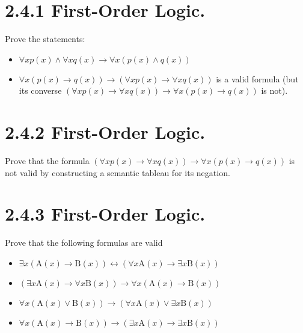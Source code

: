 \documentclass{article}
\begin{document}
\section*{2.4.1 First-Order Logic.}
Prove the statements:
\begin{itemize}
    \item $\forall x p ( x ) \wedge \forall x q ( x ) \rightarrow \forall x ( p ( x ) \wedge q ( x ) )$
    
    \item $\forall x ( p ( x ) \rightarrow q ( x ) ) \rightarrow ( \forall x p ( x ) \rightarrow \forall x q ( x ) )$ is a valid formula (but its converse $( \forall x p ( x ) \rightarrow \forall x q ( x ) ) \rightarrow \forall x ( p ( x ) \rightarrow q ( x ) )$ is not).
\end{itemize}

\section*{2.4.2 First-Order Logic.}
Prove that the formula $( \forall x p ( x ) \rightarrow \forall x q ( x ) ) \rightarrow \forall x ( p ( x ) \rightarrow q ( x ) )$ is not valid by constructing a semantic tableau for its negation.

\section*{2.4.3 First-Order Logic.}
Prove that the following formulas are valid
\begin{itemize}
    \item $\exists x (\mathrm { A } ( x ) \rightarrow \mathrm { B } ( x ) ) \leftrightarrow ( \forall x \mathrm { A } ( x ) \rightarrow \exists x \mathrm { B } ( x ) )$
    \item $(\exists x \mathrm { A } ( x ) \rightarrow \forall x \mathrm { B } ( x ) ) \rightarrow \forall x ( \mathrm { A } ( x ) \rightarrow \mathrm { B } ( x ) )$
    \item $\forall x (\mathrm { A } ( x ) \vee \mathrm { B } ( x ) ) \rightarrow ( \forall x \mathrm { A } ( x ) \vee \exists x \mathrm { B } ( x ) )$
    \item $\forall x (\mathrm { A } ( x ) \rightarrow \mathrm { B } ( x ) ) \rightarrow ( \exists x \mathrm { A } ( x ) \rightarrow \exists x \mathrm { B } ( x ) )$
\end{itemize}
\end{document}
